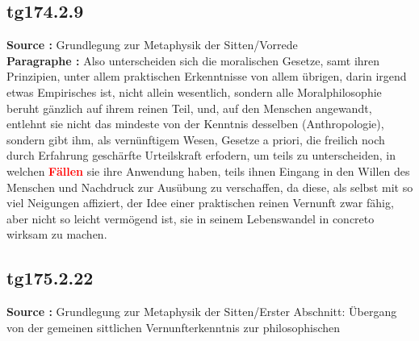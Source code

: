 \documentclass[a4paper,12pt,twoside]{book}
\newcommand{\match}[1]{\textcolor{red}{\textbf{#1}}}
\begin{document}
	\subsection*{tg174.2.9} 
	\textbf{Source : }Grundlegung zur Metaphysik der Sitten/Vorrede\\  
	
	\textbf{Paragraphe : }Also unterscheiden sich die moralischen Gesetze, samt ihren Prinzipien, unter allem praktischen Erkenntnisse von allem übrigen, darin irgend etwas Empirisches ist, nicht allein wesentlich, sondern alle Moralphilosophie beruht gänzlich auf ihrem reinen Teil, und, auf den Menschen angewandt, entlehnt sie nicht das mindeste von der Kenntnis desselben (Anthropologie), sondern gibt ihm, als vernünftigem Wesen, Gesetze a priori, die freilich noch durch Erfahrung geschärfte Urteilskraft erfodern, um teils zu unterscheiden,  in welchen \match{Fällen} sie ihre Anwendung haben, teils ihnen Eingang in den Willen des Menschen und Nachdruck zur Ausübung zu verschaffen, da diese, als selbst mit so viel Neigungen affiziert, der Idee einer praktischen reinen Vernunft zwar fähig, aber nicht so leicht vermögend ist, sie in seinem Lebenswandel in concreto wirksam zu machen. 
	
	\subsection*{tg175.2.22} 
	\textbf{Source : }Grundlegung zur Metaphysik der Sitten/Erster Abschnitt: Übergang von der gemeinen sittlichen Vernunfterkenntnis zur philosophischen\\  
	
\end{document}
